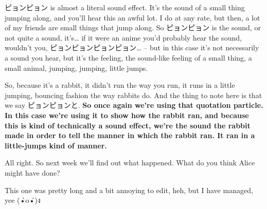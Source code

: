 ピョンピョン is almost a literal sound effect. It's the sound of a small thing jumping along, and you'll hear this an awful lot. I do at any rate, but then, a lot of my friends are small things that jump along. So ピョンピョン is the sound, or not quite a sound, it's\ldots{} if it were an anime you'd probably hear the sound, wouldn't you, ピョンピョンピョンピョン\ldots{} -- but in this case it's not necessarily a sound you hear, but it's the feeling, the sound-like feeling of a small thing, a small animal, jumping, jumping, little jumps.

So, because it's a rabbit, it didn't run the way you run, it runs in a little jumping, bouncing fashion the way rabbits do. And the thing to note here is that we say ピョンピョンと. {\bf So once again we're using that quotation particle. In this case we're using it to show how the rabbit ran, and because this is kind of technically a sound effect, we're  the sound the rabbit made in order to tell the manner in which the rabbit ran. It ran in a little-jumps kind of manner.}

All right. So next week we'll find out what happened. What do you think Alice might have done?

This one was pretty long and a bit annoying to edit, heh, but I have managed, yee (•̀o•́)ง

\stopsectionlevel

\stopsectionlevel
